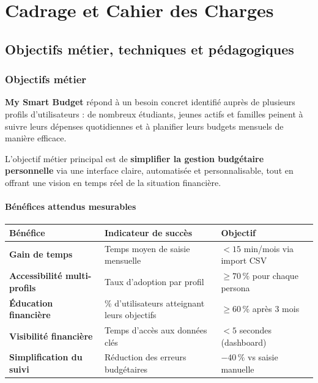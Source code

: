 \chapter{Cadrage et Cahier des Charges}

\section{Objectifs métier, techniques et pédagogiques}

\subsection{Objectifs métier}

\textbf{My Smart Budget} répond à un besoin concret identifié auprès de plusieurs profils d'utilisateurs : de nombreux étudiants, jeunes actifs et familles peinent à suivre leurs dépenses quotidiennes et à planifier leurs budgets mensuels de manière efficace.

L'objectif métier principal est de \textbf{simplifier la gestion budgétaire personnelle} via une interface claire, automatisée et personnalisable, tout en offrant une vision en temps réel de la situation financière.

\subsubsection{Bénéfices attendus mesurables}

\begin{center}
\begin{tabular}{|p{4cm}|p{4.5cm}|p{3cm}|}
\hline
\textbf{Bénéfice} & \textbf{Indicateur de succès} & \textbf{Objectif} \\
\hline
\textbf{Gain de temps} & Temps moyen de saisie mensuelle & $< 15$ min/mois via import CSV \\
\hline
\textbf{Accessibilité multi-profils} & Taux d'adoption par profil & $\geq 70\,\%$ pour chaque persona \\
\hline
\textbf{Éducation financière} & \% d'utilisateurs atteignant leurs objectifs & $\geq 60\,\%$ après 3 mois \\
\hline
\textbf{Visibilité financière} & Temps d'accès aux données clés & $< 5$ secondes (dashboard) \\
\hline
\textbf{Simplification du suivi} & Réduction des erreurs budgétaires & $-40\,\%$ vs saisie manuelle \\
\hline
\end{tabular}
\end{center}

